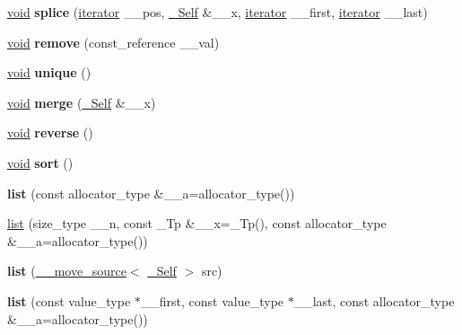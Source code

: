 \begin{DoxyCompactItemize}
\item 
\mbox{\label{classlist_aeb47b5a92f0f20e60a968413fb6a5c3b}} 
\hyperlink{interfacevoid}{void} {\bfseries splice} (\hyperlink{structiterator}{iterator} \+\_\+\+\_\+pos, \hyperlink{classlist}{\+\_\+\+Self} \&\+\_\+\+\_\+x, \hyperlink{structiterator}{iterator} \+\_\+\+\_\+first, \hyperlink{structiterator}{iterator} \+\_\+\+\_\+last)
\item 
\mbox{\label{classlist_a52484ae31cdb4dd26edb20940b7fbde0}} 
\hyperlink{interfacevoid}{void} {\bfseries remove} (const\+\_\+reference \+\_\+\+\_\+val)
\item 
\mbox{\label{classlist_a092e93c572cc4e13b73ca0211fdcff49}} 
\hyperlink{interfacevoid}{void} {\bfseries unique} ()
\item 
\mbox{\label{classlist_a3517ca7c839747061d80808313633dc2}} 
\hyperlink{interfacevoid}{void} {\bfseries merge} (\hyperlink{classlist}{\+\_\+\+Self} \&\+\_\+\+\_\+x)
\item 
\mbox{\label{classlist_a802b55ccb93d228ee7034a7e0ac10df4}} 
\hyperlink{interfacevoid}{void} {\bfseries reverse} ()
\item 
\mbox{\label{classlist_a881d5763b24c96c18cc0e3087700575a}} 
\hyperlink{interfacevoid}{void} {\bfseries sort} ()
\item 
\mbox{\label{classlist_af0d639828145b9429995b52d2b647f79}} 
{\bfseries list} (const allocator\+\_\+type \&\+\_\+\+\_\+a=allocator\+\_\+type())
\item 
\hyperlink{classlist_a25456fb5186db57fdb442fa996346315}{list} (size\+\_\+type \+\_\+\+\_\+n, const \+\_\+\+Tp \&\+\_\+\+\_\+x=\+\_\+\+Tp(), const allocator\+\_\+type \&\+\_\+\+\_\+a=allocator\+\_\+type())
\item 
\mbox{\label{classlist_aad77ca312f745fad13978f49b9b5d749}} 
{\bfseries list} (\hyperlink{class____move__source}{\+\_\+\+\_\+move\+\_\+source}$<$ \hyperlink{classlist}{\+\_\+\+Self} $>$ src)
\item 
\mbox{\label{classlist_a6376b412c44ef40a1bb1c3e276f78526}} 
{\bfseries list} (const value\+\_\+type $\ast$\+\_\+\+\_\+first, const value\+\_\+type $\ast$\+\_\+\+\_\+last, const allocator\+\_\+type \&\+\_\+\+\_\+a=allocator\+\_\+type())

\end{DoxyCompactItemize}
